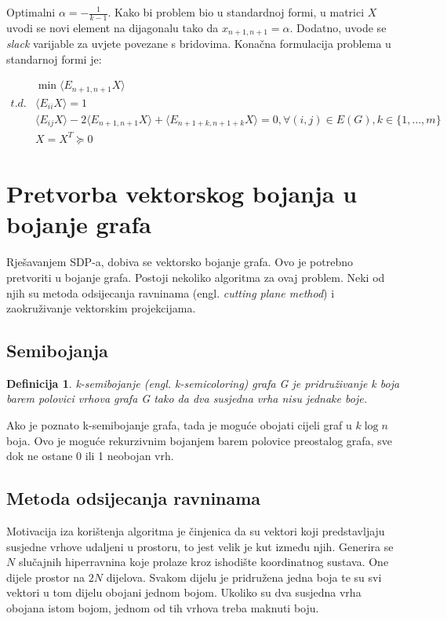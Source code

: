 \documentclass[diplomskirad]{fer}
\newtheorem{definicija}{Definicija}
\begin{document}
Optimalni $\alpha = -\frac{1}{k-1}$. Kako bi problem bio u standardnoj formi, u matrici $X$ uvodi se novi element na dijagonalu tako da
$x_{n+1,n+1} = \alpha$. Dodatno, uvode se \textit{slack} varijable za uvjete povezane s bridovima. Konačna formulacija problema u standarnoj formi je: 


\begin{equation} \label{sdpbojanje}
  \begin{split}
    & \min \langle E_{n+1,n+1}X \rangle \\
    t.d. & \langle E_{ii}X \rangle = 1 \\
         & \langle E_{ij}X \rangle - 2 \langle E_{n+1,n+1}X \rangle + \langle E_{n+1+k,n+1+k}X \rangle = 0, \forall (i,j) \in E(G), k \in \{1,\dots,m\} \\
         & X=X^T \succeq 0 
  \end{split}
\end{equation}

\section{Pretvorba vektorskog bojanja u bojanje grafa}
Rješavanjem SDP-a, dobiva se vektorsko bojanje grafa. Ovo je potrebno pretvoriti u bojanje grafa. Postoji nekoliko algoritma za ovaj problem. Neki od njih su metoda odsijecanja ravninama 
(engl. \textit{cutting plane method}) i zaokruživanje vektorskim projekcijama.

\subsection{Semibojanja}
\begin{definicija}
  k-semibojanje (engl. \textit{k-semicoloring}) grafa G je pridruživanje k boja barem polovici vrhova grafa G tako da dva susjedna vrha nisu jednake boje. 
\end{definicija}

Ako je poznato k-semibojanje grafa, tada je moguće obojati cijeli graf u $k\log n$ boja. Ovo je moguće rekurzivnim bojanjem barem polovice preostalog grafa,
sve dok ne ostane 0 ili 1 neobojan vrh.

\subsection{Metoda odsijecanja ravninama}
Motivacija iza korištenja algoritma je činjenica da su vektori koji predstavljaju susjedne vrhove udaljeni u prostoru, to jest velik je kut između njih.
Generira se $N$ slučajnih hiperravnina koje prolaze kroz ishodište koordinatnog sustava. One dijele prostor na $2N$ dijelova. Svakom dijelu je pridružena
jedna boja te su svi vektori u tom dijelu obojani jednom bojom. Ukoliko su dva susjedna vrha obojana istom bojom, jednom od tih vrhova treba maknuti boju.
\end{document}
